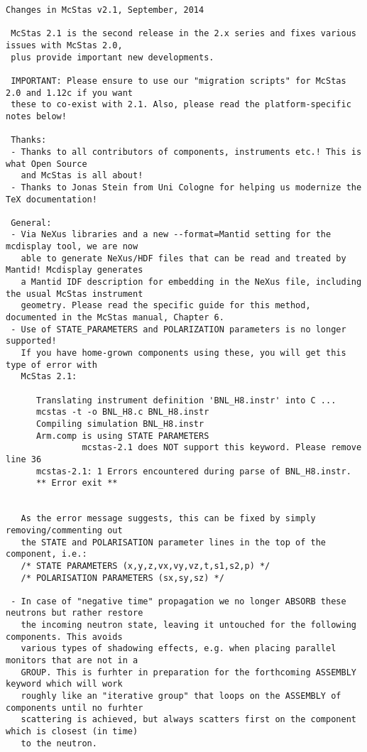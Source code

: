 \begin{lstlisting}
Changes in McStas v2.1, September, 2014

 McStas 2.1 is the second release in the 2.x series and fixes various issues with McStas 2.0,
 plus provide important new developments.

 IMPORTANT: Please ensure to use our "migration scripts" for McStas 2.0 and 1.12c if you want
 these to co-exist with 2.1. Also, please read the platform-specific notes below!

 Thanks:
 - Thanks to all contributors of components, instruments etc.! This is what Open Source
   and McStas is all about!
 - Thanks to Jonas Stein from Uni Cologne for helping us modernize the TeX documentation!
 
 General:
 - Via NeXus libraries and a new --format=Mantid setting for the mcdisplay tool, we are now
   able to generate NeXus/HDF files that can be read and treated by Mantid! Mcdisplay generates
   a Mantid IDF description for embedding in the NeXus file, including the usual McStas instrument
   geometry. Please read the specific guide for this method, documented in the McStas manual, Chapter 6.
 - Use of STATE_PARAMETERS and POLARIZATION parameters is no longer supported!
   If you have home-grown components using these, you will get this type of error with 
   McStas 2.1:

      Translating instrument definition 'BNL_H8.instr' into C ...
      mcstas -t -o BNL_H8.c BNL_H8.instr
      Compiling simulation BNL_H8.instr
      Arm.comp is using STATE PARAMETERS
      	       mcstas-2.1 does NOT support this keyword. Please remove line 36
      mcstas-2.1: 1 Errors encountered during parse of BNL_H8.instr.
      ** Error exit **

      
   As the error message suggests, this can be fixed by simply removing/commenting out
   the STATE and POLARISATION parameter lines in the top of the component, i.e.:
   /* STATE PARAMETERS (x,y,z,vx,vy,vz,t,s1,s2,p) */
   /* POLARISATION PARAMETERS (sx,sy,sz) */
   
 - In case of "negative time" propagation we no longer ABSORB these neutrons but rather restore
   the incoming neutron state, leaving it untouched for the following components. This avoids
   various types of shadowing effects, e.g. when placing parallel monitors that are not in a 
   GROUP. This is furhter in preparation for the forthcoming ASSEMBLY keyword which will work
   roughly like an "iterative group" that loops on the ASSEMBLY of components until no furhter
   scattering is achieved, but always scatters first on the component which is closest (in time)
   to the neutron.


\end{lstlisting}
